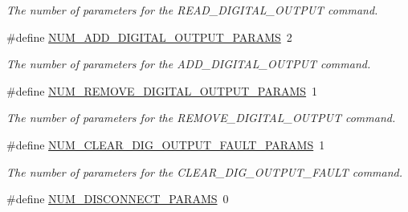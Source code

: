 \begin{DoxyCompactItemize}
\begin{DoxyCompactList}\small\item\em The number of parameters for the R\-E\-A\-D\-\_\-\-D\-I\-G\-I\-T\-A\-L\-\_\-\-O\-U\-T\-P\-U\-T command. \end{DoxyCompactList}\item 
\hypertarget{group__command__interpreter_gadea8918a215685b1576f95e1fb754778}{\#define \hyperlink{group__command__interpreter_gadea8918a215685b1576f95e1fb754778}{N\-U\-M\-\_\-\-A\-D\-D\-\_\-\-D\-I\-G\-I\-T\-A\-L\-\_\-\-O\-U\-T\-P\-U\-T\-\_\-\-P\-A\-R\-A\-M\-S}~2}\label{group__command__interpreter_gadea8918a215685b1576f95e1fb754778}

\begin{DoxyCompactList}\small\item\em The number of parameters for the A\-D\-D\-\_\-\-D\-I\-G\-I\-T\-A\-L\-\_\-\-O\-U\-T\-P\-U\-T command. \end{DoxyCompactList}\item 
\hypertarget{group__command__interpreter_gaab1534ae5702e990bfdc0f8c85094df0}{\#define \hyperlink{group__command__interpreter_gaab1534ae5702e990bfdc0f8c85094df0}{N\-U\-M\-\_\-\-R\-E\-M\-O\-V\-E\-\_\-\-D\-I\-G\-I\-T\-A\-L\-\_\-\-O\-U\-T\-P\-U\-T\-\_\-\-P\-A\-R\-A\-M\-S}~1}\label{group__command__interpreter_gaab1534ae5702e990bfdc0f8c85094df0}

\begin{DoxyCompactList}\small\item\em The number of parameters for the R\-E\-M\-O\-V\-E\-\_\-\-D\-I\-G\-I\-T\-A\-L\-\_\-\-O\-U\-T\-P\-U\-T command. \end{DoxyCompactList}\item 
\hypertarget{group__command__interpreter_gaebf261e1faa9877050475c6a01c2f698}{\#define \hyperlink{group__command__interpreter_gaebf261e1faa9877050475c6a01c2f698}{N\-U\-M\-\_\-\-C\-L\-E\-A\-R\-\_\-\-D\-I\-G\-\_\-\-O\-U\-T\-P\-U\-T\-\_\-\-F\-A\-U\-L\-T\-\_\-\-P\-A\-R\-A\-M\-S}~1}\label{group__command__interpreter_gaebf261e1faa9877050475c6a01c2f698}

\begin{DoxyCompactList}\small\item\em The number of parameters for the C\-L\-E\-A\-R\-\_\-\-D\-I\-G\-\_\-\-O\-U\-T\-P\-U\-T\-\_\-\-F\-A\-U\-L\-T command. \end{DoxyCompactList}\item 
\hypertarget{group__command__interpreter_gab5824d68d182fb33e2aebc616288f06a}{\#define \hyperlink{group__command__interpreter_gab5824d68d182fb33e2aebc616288f06a}{N\-U\-M\-\_\-\-D\-I\-S\-C\-O\-N\-N\-E\-C\-T\-\_\-\-P\-A\-R\-A\-M\-S}~0}\label{group__command__interpreter_gab5824d68d182fb33e2aebc616288f06a}


\end{DoxyCompactItemize}
